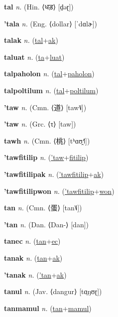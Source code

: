 \textbf{\hypertarget{tal}{tal}} \textit{n.} (Hin. ⟨{\devanagari{}धड़}⟩ [d̤əɽ])


\textbf{\hypertarget{'tala}{'tala}} \textit{n.} (Eng. ⟨dollar⟩ [ˈdɑlɚ])


\textbf{\hypertarget{talak}{talak}} \textit{n.} (\hyperlink{tal}{tal}+\allowbreak \hyperlink{ak}{ak})


\textbf{\hypertarget{taluat}{taluat}} \textit{n.} (\hyperlink{ta}{ta}+\allowbreak \hyperlink{luat}{luat})


\textbf{\hypertarget{talpaholon}{talpaholon}} \textit{n.} (\hyperlink{tal}{tal}+\allowbreak \hyperlink{paholon}{paholon})


\textbf{\hypertarget{talpoltilum}{talpoltilum}} \textit{n.} (\hyperlink{tal}{tal}+\allowbreak \hyperlink{poltilum}{poltilum})


\textbf{\hypertarget{'taw}{'taw}} \textit{n.} (Cmn. ⟨{\chinese{}道}⟩ [taw˥˩])


\textbf{\hypertarget{'taw}{'taw}} \textit{n.} (Grc. ⟨τ⟩ [taw])


\textbf{\hypertarget{tawh}{tawh}} \textit{n.} (Cmn. ⟨{\chinese{}桃}⟩ [tʰɑʊ̯˧˥])


\textbf{\hypertarget{'tawfitilip}{'tawfitilip}} \textit{n.} (\hyperlink{'taw}{'taw}+\allowbreak \hyperlink{fitilip}{fitilip})


\textbf{\hypertarget{'tawfitilipak}{'tawfitilipak}} \textit{n.} (\hyperlink{'tawfitilip}{'tawfitilip}+\allowbreak \hyperlink{ak}{ak})


\textbf{\hypertarget{'tawfitilipwon}{'tawfitilipwon}} \textit{n.} (\hyperlink{'tawfitilip}{'tawfitilip}+\allowbreak \hyperlink{won}{won})


\textbf{\hypertarget{tan}{tan}} \textit{n.} (Cmn. ⟨{\chinese{}蛋}⟩ [tan˥˩])


\textbf{\hypertarget{'tan}{'tan}} \textit{n.} (Dan. ⟨Dan-⟩ [dan])


\textbf{\hypertarget{tanec}{tanec}} \textit{n.} (\hyperlink{tan}{tan}+\allowbreak \hyperlink{ec}{ec})


\textbf{\hypertarget{tanak}{tanak}} \textit{n.} (\hyperlink{tan}{tan}+\allowbreak \hyperlink{ak}{ak})


\textbf{\hypertarget{'tanak}{'tanak}} \textit{n.} (\hyperlink{'tan}{'tan}+\allowbreak \hyperlink{ak}{ak})


\textbf{\hypertarget{tanul}{tanul}} \textit{n.} (Jav. ⟨dangur⟩ [tɑ̤ŋʊɽ])


\textbf{\hypertarget{tanmamul}{tanmamul}} \textit{n.} (\hyperlink{tan}{tan}+\allowbreak \hyperlink{mamul}{mamul})


